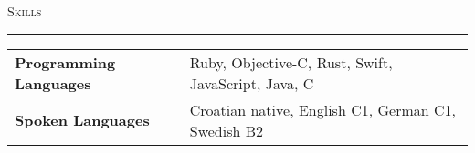 \documentclass[10pt, a4paper, final, onecolumn, oneside, notitlepage]{article}
\newcommand{\sectionspacing}[0]{ \vspace{10pt} } %
\newcommand{\sectionrule}[0]{ \rule[6pt]{\textwidth}{0.5pt} } %
\renewcommand{\section}[1]{\sectionspacing {\large \scshape #1} \sectionrule}
\begin{document}
\begin{center}

\section{Skills}
\begin{tabular}{ >{\hfill}p{} p{} }
\textbf{Programming Languages} & Ruby, Objective-C, Rust, Swift, JavaScript,
Java, C \\
\textbf{Spoken Languages} & Croatian native, English C1, German C1,
Swedish B2 \\
\end{tabular}

\end{center}
\end{document}

